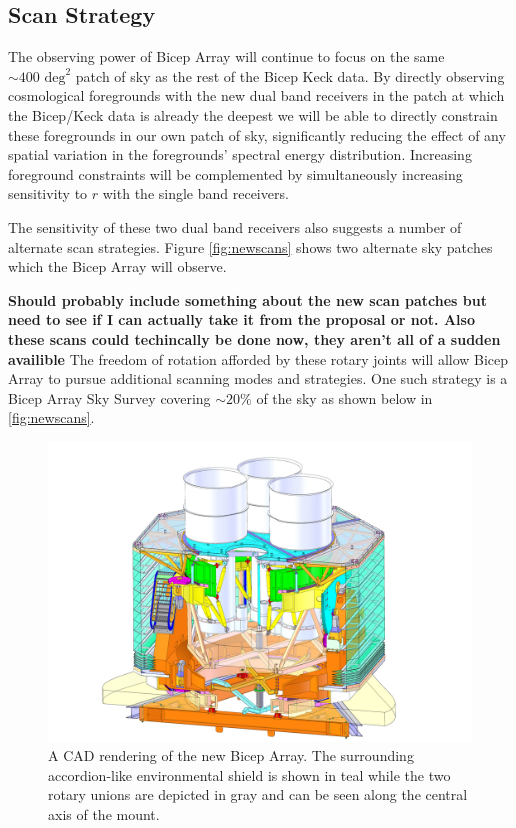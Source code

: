 \documentclass[]{spie}  %
\begin{document}
\subsection{Scan Strategy}

The observing power of Bicep Array will continue to focus on the same $\sim400
\text{ deg}^2$ patch of sky as the rest of the Bicep Keck data. By directly
observing cosmological foregrounds with the new dual band receivers in the
patch at which the Bicep/Keck data is already the deepest we will be able to
directly constrain these foregrounds in our own patch of sky, significantly
reducing the effect of any spatial variation in the foregrounds' spectral
energy distribution. Increasing foreground constraints will be complemented by
simultaneously increasing sensitivity to $r$ with the single band receivers. 

The sensitivity of these two dual band receivers also suggests a number of
alternate scan strategies. Figure \ref{fig:newscans} shows two alternate sky
patches which the Bicep Array will observe.

\textbf{Should probably include something about the new scan patches but need
to see if I can actually take it from the proposal or not. Also these scans
could techincally be done now, they aren't all of a sudden availible}
The freedom of rotation afforded by these rotary joints will allow
Bicep Array to pursue additional scanning modes and strategies. One such
strategy is a Bicep Array Sky Survey covering $\sim20\%$ of the sky as
shown below in \ref{fig:newscans}.

\begin{figure} [hb]
	\begin{center}
		\includegraphics[scale=0.4]{BA_mount_isosection.JPG}
	\end{center}
	\caption{A CAD rendering of the new Bicep Array. The surrounding
	accordion-like environmental shield is shown in teal while the two rotary
	unions are depicted in gray and can be seen along the central axis of the
	mount.}
	\label{fig:bamount}
\end{figure}



\end{document}
